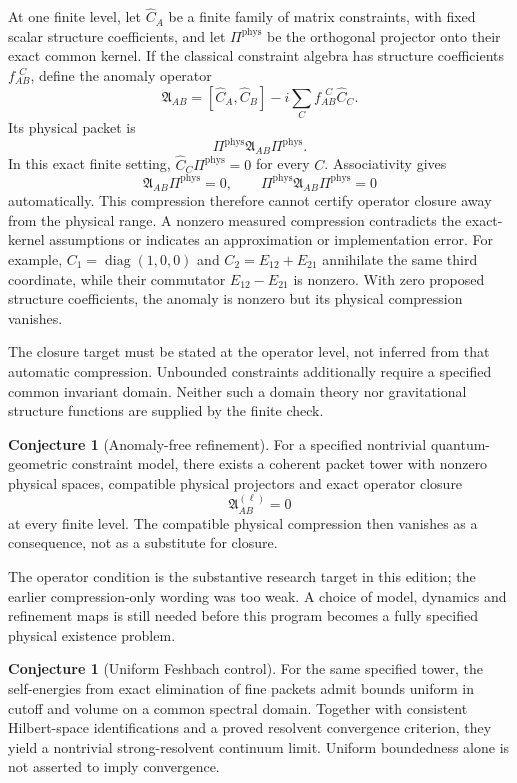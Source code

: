 \documentclass[11pt]{article}
\theoremstyle{definition}
\newtheorem{conjecture}[theorem]{Conjecture}
\theoremstyle{remark}
\begin{document}
At one finite level, let $\widehat C_A$ be a finite family of matrix constraints, with fixed scalar structure coefficients, and let $\Pi^{\mathrm{phys}}$ be the orthogonal projector onto their exact common kernel. If the classical constraint algebra has structure coefficients $f_{AB}^{\ \ C}$, define the anomaly operator
\[
\boxed{
\mathfrak A_{AB}
=
[\widehat C_A,\widehat C_B]
-i\sum_C f_{AB}^{\ \ C}\widehat C_C.
}
\]
Its physical packet is
\[
\Pi^{\mathrm{phys}}\mathfrak A_{AB}\Pi^{\mathrm{phys}}.
\]
In this exact finite setting, $\widehat C_C\Pi^{\mathrm{phys}}=0$ for every $C$. Associativity gives
\[
\mathfrak A_{AB}\Pi^{\mathrm{phys}}=0,
\qquad
\Pi^{\mathrm{phys}}\mathfrak A_{AB}\Pi^{\mathrm{phys}}=0
\]
automatically. This compression therefore cannot certify operator closure away from the physical range. A nonzero measured compression contradicts the exact-kernel assumptions or indicates an approximation or implementation error. For example, $C_1=\operatorname{diag}(1,0,0)$ and $C_2=E_{12}+E_{21}$ annihilate the same third coordinate, while their commutator $E_{12}-E_{21}$ is nonzero. With zero proposed structure coefficients, the anomaly is nonzero but its physical compression vanishes.

The closure target must be stated at the operator level, not inferred from that automatic compression. Unbounded constraints additionally require a specified common invariant domain. Neither such a domain theory nor gravitational structure functions are supplied by the finite check.

\begin{conjecture}[Anomaly-free refinement]
For a specified nontrivial quantum-geometric constraint model, there exists a coherent packet tower with nonzero physical spaces, compatible physical projectors and exact operator closure
\[
\mathfrak A^{(\ell)}_{AB}=0
\]
at every finite level. The compatible physical compression then vanishes as a consequence, not as a substitute for closure.
\end{conjecture}
The operator condition is the substantive research target in this edition; the earlier compression-only wording was too weak. A choice of model, dynamics and refinement maps is still needed before this program becomes a fully specified physical existence problem.

\begin{conjecture}[Uniform Feshbach control]
For the same specified tower, the self-energies from exact elimination of fine packets admit bounds uniform in cutoff and volume on a common spectral domain. Together with consistent Hilbert-space identifications and a proved resolvent convergence criterion, they yield a nontrivial strong-resolvent continuum limit. Uniform boundedness alone is not asserted to imply convergence.
\end{conjecture}
\end{document}
